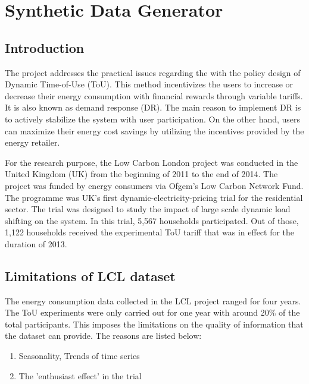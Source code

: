 \chapter{Synthetic Data Generator}

\section{Introduction}

The project addresses the practical issues regarding the with the policy design of Dynamic Time-of-Use (ToU). This method incentivizes the users to increase or decrease their energy consumption with financial rewards through variable tariffs. It is also known as demand response (DR). The main reason to implement DR is to actively stabilize the system with user participation. On the other hand, users can maximize their energy cost savings by utilizing the incentives provided by the energy retailer.

For the research purpose, the Low Carbon London project was conducted in the United Kingdom (UK) from the beginning of 2011 to the end of 2014. The project was funded by energy consumers via Ofgem's Low Carbon Network Fund. The programme was UK's first dynamic-electricity-pricing trial for the residential sector. The trial was designed to study the impact of large scale dynamic load shifting on the system. In this trial, 5,567 households participated. Out of those, 1,122 households received the experimental ToU tariff that was in effect for the duration of 2013.

\section{Limitations of LCL dataset}
\label{limits-lcl}
The energy consumption data collected in the LCL project ranged for four years. The ToU experiments were only carried out for one year with around 20\% of the total participants. This imposes the limitations on the quality of information that the dataset can provide. The reasons are listed below:

\begin{enumerate}
    \item Seasonality, Trends of time series
    \item The 'enthusiast effect' in the trial
\end{enumerate}


